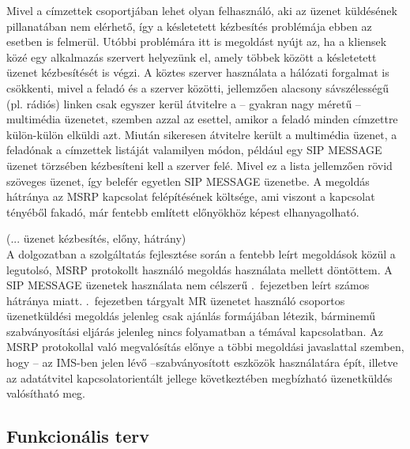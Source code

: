 Mivel a címzettek csoportjában lehet olyan felhasználó, aki az üzenet küldésének pillanatában nem elérhető, így a késletetett kézbesítés problémája ebben az esetben is felmerül. Utóbbi problémára itt is megoldást nyújt az, ha a kliensek közé egy alkalmazás szervert helyezünk el, amely többek között a késletetett üzenet kézbesítését is végzi. A köztes szerver használata a hálózati forgalmat is csökkenti, mivel a feladó és a szerver közötti, jellemzően alacsony sávszélességű (pl. rádiós) linken csak egyszer kerül átvitelre a -- gyakran nagy méretű -- multimédia üzenetet, szemben azzal az esettel, amikor a feladó minden címzettre külön-külön elküldi azt. Miután sikeresen átvitelre került a multimédia üzenet, a feladónak a címzettek listáját valamilyen módon, például egy SIP MESSAGE üzenet törzsében kézbesíteni kell a szerver felé. Mivel ez a lista jellemzően rövid szöveges üzenet, így belefér egyetlen SIP MESSAGE üzenetbe. A megoldás hátránya az MSRP kapcsolat felépítésének költsége, ami viszont a kapcsolat tényéből fakadó, már fentebb említett előnyökhöz képest elhanyagolható.

{\color{red} (... üzenet kézbesítés, előny, hátrány)}
\\
A dolgozatban a szolgáltatás fejlesztése során a fentebb leírt megoldások közül a legutolsó, MSRP protokollt használó megoldás használata mellett döntöttem. A SIP MESSAGE üzenetek használata nem célszerű .~fejezetben leírt számos hátránya miatt. .~fejezetben tárgyalt MR üzenetet használó csoportos üzenetküldési megoldás jelenleg csak ajánlás formájában létezik, bárminemű szabványosítási eljárás jelenleg nincs folyamatban a témával kapcsolatban. Az MSRP protokollal való megvalósítás előnye a többi megoldási javaslattal szemben, hogy -- az IMS-ben jelen lévő --szabványosított eszközök használatára épít, illetve az adatátvitel kapcsolatorientált jellege következtében megbízható üzenetküldés valósítható meg. 

\subsection{Funkcionális terv}

